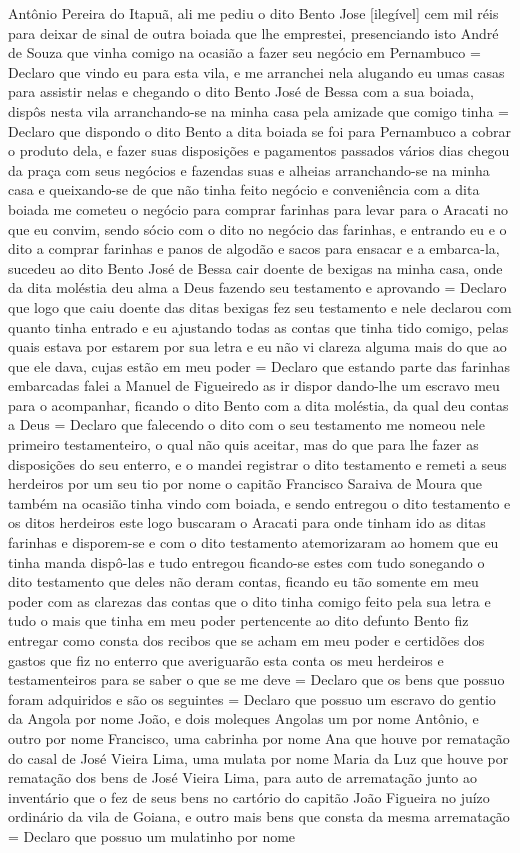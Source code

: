 \begin{refsection}
Antônio Pereira do Itapuã, ali me pediu o dito Bento Jose [ilegível] cem mil réis para deixar de sinal de outra boiada que lhe emprestei, presenciando isto André de Souza que vinha comigo na ocasião a fazer seu negócio em Pernambuco = Declaro que vindo eu para esta vila, e me arranchei nela alugando eu umas casas para assistir nelas e chegando o dito Bento José de Bessa com a sua boiada, dispôs nesta vila arranchando-se na minha casa pela amizade que comigo tinha = Declaro que dispondo o dito Bento a dita boiada se foi para Pernambuco a cobrar o produto dela, e fazer suas disposições e pagamentos passados vários dias chegou da praça com seus negócios e fazendas suas e alheias arranchando-se na minha casa e queixando-se de que não tinha feito negócio e conveniência com a dita boiada me cometeu o negócio para comprar farinhas para levar para o Aracati no que eu convim, sendo sócio com o dito no negócio das farinhas, e entrando eu e o dito a comprar farinhas e panos de algodão e sacos para ensacar e a embarca-la, sucedeu ao dito Bento José de Bessa cair doente de bexigas na minha casa, onde da dita moléstia deu alma a Deus fazendo seu testamento e aprovando = Declaro que logo que caiu doente das ditas bexigas fez seu testamento e nele declarou com quanto tinha entrado e eu ajustando todas as contas que tinha tido comigo, pelas quais estava por estarem por sua letra e eu não vi clareza alguma mais do que ao que ele dava, cujas estão em meu poder = Declaro que estando parte das farinhas embarcadas falei a Manuel de Figueiredo as ir dispor dando-lhe um escravo meu para o acompanhar, ficando o dito Bento com a dita moléstia, da qual deu contas a Deus = Declaro que falecendo o dito com o seu testamento me nomeou nele primeiro testamenteiro, o qual não quis aceitar, mas do que para lhe fazer as disposições do seu enterro, e o mandei registrar o dito testamento e remeti a seus herdeiros por um seu tio por nome o capitão Francisco Saraiva de Moura que também na ocasião tinha vindo com boiada, e sendo entregou o dito testamento e os ditos herdeiros este logo buscaram o Aracati para onde tinham ido as ditas farinhas e disporem-se e com o dito testamento atemorizaram ao homem que eu tinha manda dispô-las e tudo entregou ficando-se estes com tudo sonegando o dito testamento que deles não deram contas, ficando eu tão somente em meu poder com as clarezas das contas que o dito tinha comigo feito pela sua letra e tudo o mais que tinha em meu poder pertencente ao dito defunto Bento fiz entregar como consta dos recibos que se acham em meu poder e certidões dos gastos que fiz no enterro que averiguarão esta conta os meu herdeiros e testamenteiros para se saber o que se me deve = Declaro que os bens que possuo foram adquiridos e são os seguintes = Declaro que possuo um escravo do gentio da Angola por nome João, e dois moleques Angolas um por nome Antônio, e outro por nome Francisco, uma cabrinha por nome Ana que houve por rematação do casal de José Vieira Lima, uma mulata por nome Maria da Luz que houve por rematação dos bens de José Vieira Lima, para auto de arrematação junto ao inventário que o fez de seus bens no cartório do capitão João Figueira no juízo ordinário da vila de Goiana, e outro mais bens que consta da mesma arrematação = Declaro que possuo um mulatinho por nome 
\end{refsection}
